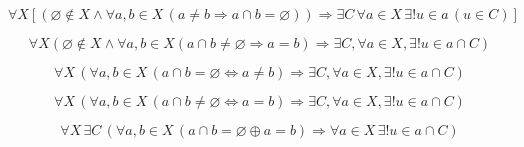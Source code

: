 \begin{axiom}
$$
	\forall X\left[
		\left(
			\varnothing\notin X
			\land
			\forall a,b\in X\,
			(a\neq b\Rightarrow a\cap b=\varnothing)
		\right)
		\Rightarrow
		\exists C\,\forall a\in X\,\exists!u\in a\,(u\in C)
	\right]
$$
\end{axiom}

\begin{axiom}
$$
	\forall X(
		\varnothing\notin X
		\land
		\forall a,b\in X(
			a\cap b
			\neq
			\varnothing
			\Rightarrow
			a=b
		)
		\Rightarrow
		\exists C,
		\forall a\in X,
		\exists!u\in a\cap C
	)
$$
\end{axiom}

\begin{axiom}
$$
	\forall X\,(
		\forall a,b\in X\,(
			a\cap b=\varnothing
			\Leftrightarrow
			a\neq b
		)
		\Rightarrow
		\exists C,
		\forall a\in X,
		\exists!u\in a\cap C
	)
$$
\end{axiom}

\begin{axiom}
$$
	\forall X\,(
		\forall a,b\in X\,(
			a\cap b\neq\varnothing
			\Leftrightarrow
			a=b
		)
		\Rightarrow
		\exists C,
		\forall a\in X,
		\exists!u\in a\cap C
	)
$$
\end{axiom}

\begin{axiom}
$$
	\forall X\,\exists C\,(
		\forall a,b\in X\,(
			a\cap b=\varnothing
			\oplus
			a=b
		)
		\Rightarrow
		\forall a\in X\,
		\exists!u\in a\cap C
	)
$$
\end{axiom}
